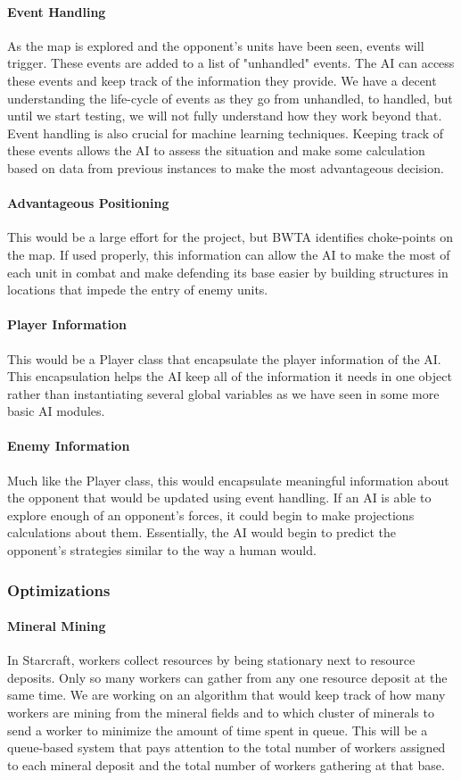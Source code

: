 \documentclass[10pt,letterpaper,onecolumn,draftclsnofoot]{IEEEtran}
\begin{document}
	\paragraph{Event Handling}
	As the map is explored and the opponent's units have been seen, events will trigger. These events are added to a list of "unhandled" events. The AI can access these events and keep track of the information they provide. We have a decent understanding the life-cycle of events as they go from unhandled, to handled, but until we start testing, we will not fully understand how they work beyond that.
	Event handling is also crucial for machine learning techniques. Keeping track of these events allows the AI to assess the situation and make some calculation based on data from previous instances to make the most advantageous decision.  
	\paragraph{Advantageous Positioning}
	This would be a large effort for the project, but BWTA identifies choke-points on the map. If used properly, this information can allow the AI to make the most of each unit in combat and make defending its base easier by building structures in locations that impede the entry of enemy units.
	\paragraph{Player Information}
	This would be a Player class that encapsulate the player information of the AI. This encapsulation helps the AI keep all of the information it needs in one object rather than instantiating several global variables as we have seen in some more basic AI modules. 
	\paragraph{Enemy Information}
	Much like the Player class, this would encapsulate meaningful information about the opponent that would be updated using event handling. If an AI is able to explore enough of an opponent's forces, it could begin to make projections calculations about them. Essentially, the AI would begin to predict the opponent's strategies similar to the way a human would. 
	
	\subsubsection{Optimizations}
	\paragraph{Mineral Mining}
	In Starcraft, workers collect resources by being stationary next to resource deposits. Only so many workers can gather from any one resource deposit at the same time. We are working on an algorithm that would keep track of how many workers are mining from the mineral fields and to which cluster of minerals to send a worker to minimize the amount of time spent in queue. This will be a queue-based system that pays attention to the total number of workers assigned to each mineral deposit and the total number of workers gathering at that base. 
\end{document}
